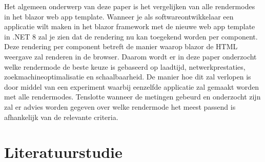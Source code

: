 \documentclass{hogent-article}
\begin{document}
Het algemeen onderwerp van deze paper is het vergelijken van alle rendermodes in het blazor web app template. Wanneer je als softwareontwikkelaar een 
applicatie wilt maken in het blazor framework met de nieuwe web app template in .NET 8 zal je zien dat de rendering nu kan toegekend worden per component. Deze rendering per component 
betreft de manier waarop blazor de HTML weergave zal renderen in de browser. Daarom wordt er in deze paper onderzocht welke
rendermode de beste keuze is gebaseerd op laadtijd, netwerkprestaties, zoekmachineoptimalisatie en schaalbaarheid. De manier hoe dit zal verlopen is door middel van een experiment waarbij eenzelfde applicatie 
zal gemaakt worden met alle rendermodes. Tenslotte wanneer de metingen gebeurd en onderzocht zijn zal er advies worden gegeven over welke rendermode het meest passend is afhankelijk van de relevante criteria.

\section{Literatuurstudie}%
\label{sec:literatuurstudie}
\end{document}

